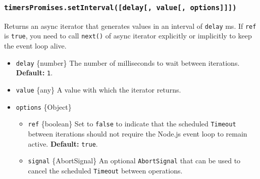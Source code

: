 \begin{Shaded}
\begin{Highlighting}[]
\NormalTok{ \{}
\OperatorTok{,}
\NormalTok{\} }\OperatorTok{=} \NormalTok{(}\NormalTok{)}\OperatorTok{;}

\NormalTok{(}\NormalTok{)}\KeywordTok{=\textgreater{}}\NormalTok{ \{}
  \OperatorTok{;}  
\NormalTok{\})}\OperatorTok{;}
\end{Highlighting}
\end{Shaded}

\subsubsection{\texorpdfstring{\texttt{timersPromises.setInterval({[}delay{[},\ value{[},\ options{]}{]}{]})}}{timersPromises.setInterval({[}delay{[}, value{[}, options{]}{]}{]})}}\label{timerspromises.setintervaldelay-value-options}

Returns an async iterator that generates values in an interval of
\texttt{delay} ms. If \texttt{ref} is \texttt{true}, you need to call
\texttt{next()} of async iterator explicitly or implicitly to keep the
event loop alive.

\begin{itemize}
\tightlist
\item
  \texttt{delay} \{number\} The number of milliseconds to wait between
  iterations. \textbf{Default:} \texttt{1}.
\item
  \texttt{value} \{any\} A value with which the iterator returns.
\item
  \texttt{options} \{Object\}

  \begin{itemize}
  \tightlist
  \item
    \texttt{ref} \{boolean\} Set to \texttt{false} to indicate that the
    scheduled \texttt{Timeout} between iterations should not require the
    Node.js event loop to remain active. \textbf{Default:}
    \texttt{true}.
  \item
    \texttt{signal} \{AbortSignal\} An optional \texttt{AbortSignal}
    that can be used to cancel the scheduled \texttt{Timeout} between
    operations.
  \end{itemize}
\end{itemize}

